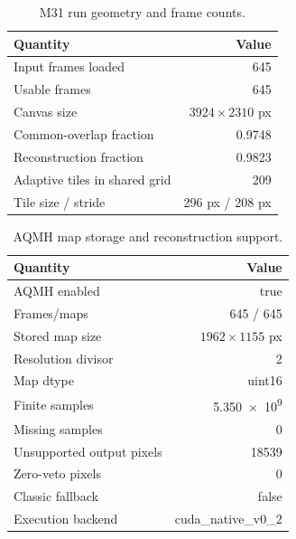 \documentclass[10pt,twocolumn]{article}
\begin{document}
\begin{table}[t]
\centering
\caption{M31 run geometry and frame counts.}
\begin{tabular}{lr}
\toprule
Quantity & Value \\
\midrule
Input frames loaded & 645 \\
Usable frames & 645 \\
Canvas size & $3924\times2310$ px \\
Common-overlap fraction & \num{0.9748} \\
Reconstruction fraction & \num{0.9823} \\
Adaptive tiles in shared grid & 209 \\
Tile size / stride & 296 px / 208 px \\
\bottomrule
\end{tabular}
\label{tab:geometry}
\end{table}

\begin{table}[t]
\centering
\caption{AQMH map storage and reconstruction support.}
{\small
\begin{tabular}{@{}lr@{}}
\toprule
Quantity & Value \\
\midrule
AQMH enabled & true \\
Frames/maps & 645 / 645 \\
Stored map size & $1962\times1155$ px \\
Resolution divisor & 2 \\
Map dtype & uint16 \\
Finite samples & \num{5.350e9} \\
Missing samples & 0 \\
Unsupported output pixels & \num{18539} \\
Zero-veto pixels & 0 \\
Classic fallback & false \\
Execution backend & cuda\_native\_v0\_2 \\
\bottomrule
\end{tabular}
}
\label{tab:support}
\end{table}
\end{document}
